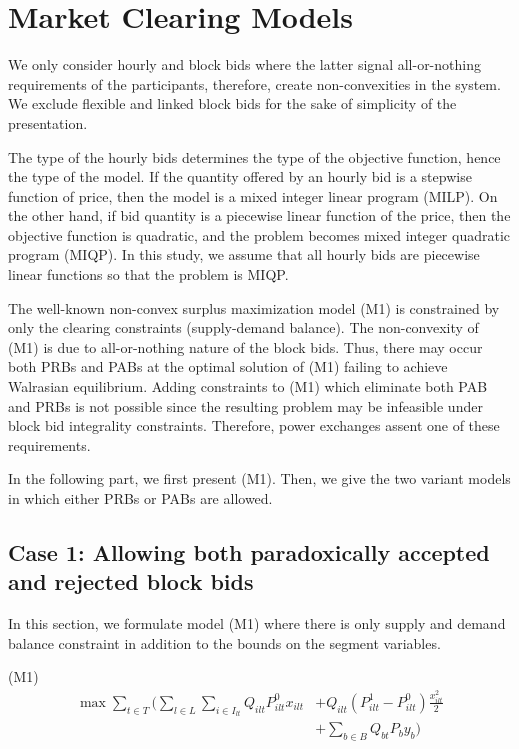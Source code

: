 \documentclass[conference]{IEEEtran}
\begin{document}
\section{Market Clearing Models}
\label{models}

We only consider hourly and block bids where the latter signal all-or-nothing requirements of the participants, therefore, create non-convexities in the system. We exclude flexible and linked block bids for the sake of simplicity of the presentation.

The type of the hourly bids determines the type of the objective function, hence the type of the model. If the quantity offered by an hourly bid is a stepwise function of price, then the model is a mixed integer linear program (MILP). On the other hand, if bid quantity is a piecewise linear function of the price, then the objective function is quadratic, and the problem becomes mixed integer quadratic program (MIQP). In this study, we assume that all hourly bids are piecewise linear functions so that the problem is MIQP. 

The well-known non-convex surplus maximization model (M1) is constrained by only the clearing constraints (supply-demand balance). The non-convexity of (M1) is due to all-or-nothing nature of the block bids. Thus, there may occur both PRBs and PABs at the optimal solution of (M1) failing to achieve Walrasian equilibrium. Adding constraints to (M1) which eliminate both PAB and PRBs is not possible since the resulting problem may be infeasible under block bid integrality constraints. Therefore, power exchanges assent one of these requirements. 

In the following part, we first present (M1). Then, we give the two variant models in which either PRBs or PABs are allowed.

\subsection{Case 1: Allowing both paradoxically accepted and rejected block bids}
In this section, we formulate model (M1) where there is only supply and demand balance constraint in addition to the bounds on the segment variables.

(M1)
\begin{equation*}
\begin{split}
    \max \sum_{t\in T} \Big ( \sum_{l\in L} \sum_{i\in I_{lt}} Q_{ilt}P_{ilt}^0 x_{ilt} &+ Q_{ilt}(P_{ilt}^1-P_{ilt}^0)\frac{x_{ilt}^2}{2} \\
    &+ \sum_{b\in B} Q_{bt} P_b y_b \Big )\\
\end{split}
\end{equation*}
\end{document}
